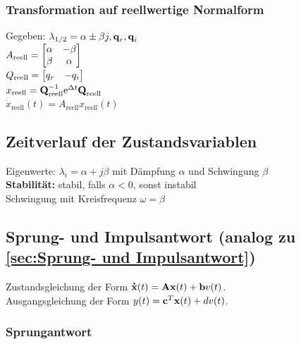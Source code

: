 \documentclass[fs, footer]{latex4ei}
\begin{document}
\begin{multicols*}{4}
		\subsubsection{Transformation auf reellwertige Normalform}
		Gegeben: $\lambda_{1/2} = \alpha \pm \beta j, \textbf{q}_r, \textbf{q}_i$\\
		$A_\text{reell} =  \begin{bmatrix} \alpha & - \beta \\ \beta & \alpha \end{bmatrix}$\\
		$Q_\text{reell} = \begin{bmatrix}  q_r & - q_i \end{bmatrix}$\\
		$x_\text{reell} = \textbf{Q}_\text{reell}^{-1} \mathrm{e}^{\Delta t}\textbf{Q}_\text{reell}$\\
		$\dot{x}_\text{reell} (t) = A_\text{reell}x_\text{reell}(t)$\\ 
		\subsection{Zeitverlauf der Zustandsvariablen}
		Eigenwerte: $\lambda_i = \alpha + j\beta$ mit Dämpfung $\alpha$ und Schwingung $\beta$\\
		\textbf{Stabilität:} stabil, falls $\alpha < 0$, sonst instabil\\
		Schwingung mit Kreisfrequenz $\omega = \beta$\\
		\subsection{Sprung- und Impulsantwort (analog zu \ref{sec:Sprung- und Impulsantwort})}
		Zustandsgleichung der Form $\accentset{\mbox{\textrm{\large\bfseries .}} }{\textbf{x}}(t) = \textbf{A}\textbf{x}(t)+\textbf{b}v(t)$.\\
		Ausgangsgleichung der Form $y(t) = \textbf{c}^T\textbf{x}(t) + dv(t)$.
		\subsubsection{Sprungantwort}
		

\end{multicols*}
\end{document}
